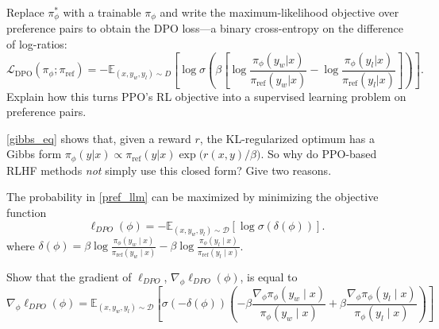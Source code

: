 \documentclass[11pt,addpoints,answers]{exam}
\begin{document}
\begin{questions}
\begin{parts}
\begin{subparts}
\noindent Replace $\pi_\phi^*$ with a trainable $\pi_\phi$ and write the maximum-likelihood objective over preference pairs to obtain the DPO loss---a binary cross-entropy on the difference of log-ratios:
\[
\mathcal{L}_{\text{DPO}}(\pi_\phi;\pi_{\mathrm{ref}})
= -\mathbb{E}_{(x,y_w,y_l)\sim D}\!\left[\log\sigma\!\left(\beta\!\left[\log\frac{\pi_\phi(y_w|x)}{\pi_{\mathrm{ref}}(y_w|x)}-\log\frac{\pi_\phi(y_l|x)}{\pi_{\mathrm{ref}}(y_l|x)}\right]\right)\right].
\]
Explain how this turns PPO’s RL objective into a supervised learning problem on preference pairs.

    \begin{answer_box}[title=,height=4cm, width=14.5cm]
    \end{answer_box}

\clearpage


    \subpart[2] \eqref{gibbs_eq} shows that, given a reward $r$, the KL-regularized optimum has a Gibbs form 
    $\pi_\phi(y|x)\propto \pi_{\mathrm{ref}}(y|x)\exp\!\big(r(x,y)/\beta\big)$.
    So why do PPO-based RLHF methods \emph{not} simply use this closed form? 
    Give two reasons.
    \begin{answer_box}[title=,height=5cm, width=14.5cm]
    \end{answer_box}

    
    
    \subpart[3] The probability in \eqref{pref_llm} can be maximized by minimizing the objective function
    \begin{equation}
        \ell_{DPO}(\phi) = -\mathbb{E}_{(x,y_w,y_l)\sim\mathcal{D}}\left[\log \sigma\left(\delta(\phi)\right) \right].
        \label{obj_llm}
    \end{equation}
    where $\delta(\phi) = \beta \log \frac{\pi_{\phi}(y_w \mid x)}{\pi_{\textrm{ref}}(y_w \mid x)} - \beta \log \frac{\pi_{\phi}(y_l \mid x)}{\pi_{\textrm{ref}}(y_l \mid x)}$. 

    Show that the gradient of $\ell_{DPO}$, $\nabla_{\phi} \ell_{DPO}(\phi)$, is equal to
    \begin{equation}
        \nabla_{\phi}\ell_{DPO}(\phi) = \mathbb{E}_{(x,y_w,y_l)\sim\mathcal{D}}\left[\sigma\left(-\delta(\phi)\right)\left(- \beta \frac{\nabla_{\phi}\pi_{\phi}(y_w \mid x)}{\pi_{\phi}(y_w \mid x)} + \beta  \frac{\nabla_{\phi}\pi_{\phi}(y_l \mid x)}{\pi_{\phi}(y_l \mid x)}\right) \right]
        \label{grad_llm}
    \end{equation}
    \begin{answer_box}[title=,height=12cm, width=14.5cm]
    \end{answer_box}


\end{subparts}
\end{parts}
\end{questions}
\end{document}
